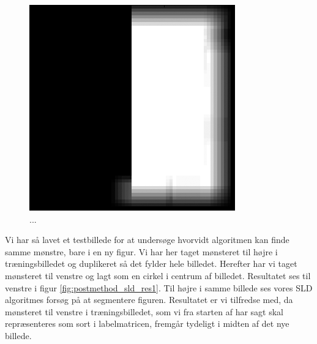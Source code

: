 \begin{figure}[H]
		\centering
		\includegraphics[scale=0.54]{files/postmethod/img/sld_preres1.png}
	\caption{...\label{fig:postmethod_sld_label1}}
\end{figure}

Vi har så lavet et testbillede for at undersøge hvorvidt algoritmen kan finde samme mønstre, bare i en ny figur. Vi har her taget mønsteret til højre i træningsbilledet og duplikeret så det fylder hele billedet. Herefter har vi taget mønsteret til venstre og lagt som en cirkel i centrum af billedet. Resultatet ses til venstre i figur \ref{fig:postmethod_sld_res1}. Til højre i samme billede ses vores SLD algoritmes forsøg på at segmentere figuren. Resultatet er vi tilfredse med, da mønsteret til venstre i træningsbilledet, som vi fra starten af har sagt skal repræsenteres som sort i labelmatricen, fremgår tydeligt i midten af det nye billede.


